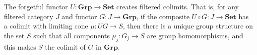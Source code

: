 The forgetful functor $U : \mathbf{Grp} \rightarrow \mathbf{Set}$ creates filtered colimits. That is, for any filtered category $J$ and functor $G : J \rightarrow \mathbf{Grp}$, if the composite $U \circ G : J \rightarrow \mathbf{Set}$ has a colimit with limiting cone $\mu : UG \rightarrow S$, then there is a unique group structure on the set $S$ such that all components $\mu_j : G_j \rightarrow S$ are group homomorphisms, and this makes $S$ the colimit of $G$ in $\mathbf{Grp}$.
